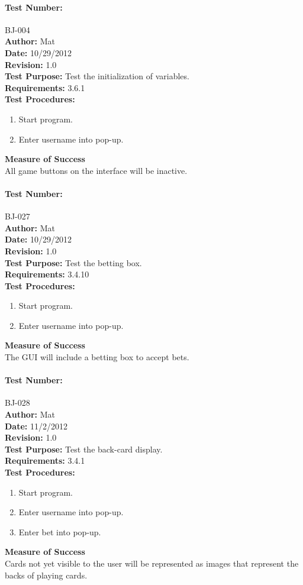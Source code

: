 \documentclass{article}
\begin{document}
\paragraph{Test Number:} BJ-004\\
\textbf{Author:} Mat\\
\textbf{Date:} 10/29/2012\\
\textbf{Revision:} 1.0\\
\textbf{Test Purpose:} Test the initialization of variables.\\
\textbf{Requirements:} 3.6.1 \\
\textbf{Test Procedures:} 
\begin{enumerate}
\item Start program.
\item Enter username into pop-up.
\end{enumerate}
\textbf{Measure of Success}\\All game buttons on the interface will be inactive.
\paragraph{Test Number:} BJ-027\\
\textbf{Author:} Mat\\
\textbf{Date:} 10/29/2012\\
\textbf{Revision:} 1.0\\
\textbf{Test Purpose:} Test the betting box.\\
\textbf{Requirements:} 3.4.10 \\
\textbf{Test Procedures:} 
\begin{enumerate}
\item Start program.
\item Enter username into pop-up.
\end{enumerate}
\textbf{Measure of Success}\\The GUI will include a betting box to accept bets.
\paragraph{Test Number:} BJ-028\\
\textbf{Author:} Mat\\
\textbf{Date:} 11/2/2012\\
\textbf{Revision:} 1.0\\
\textbf{Test Purpose:} Test the back-card display.\\
\textbf{Requirements:} 3.4.1 \\
\textbf{Test Procedures:} 
\begin{enumerate}
\item Start program.
\item Enter username into pop-up.
\item Enter bet into pop-up.
\end{enumerate}
\textbf{Measure of Success}\\Cards not yet visible to the user will be represented as images that represent the backs of playing cards.
\end{document}
